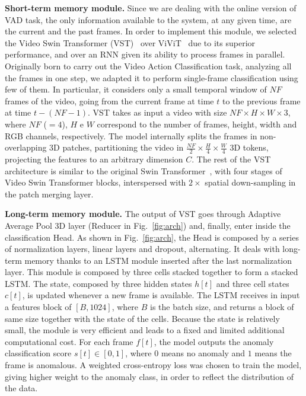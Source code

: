 \noindent\textbf{Short-term memory module.}
Since we are dealing with the online version of VAD task, the only information available to the system, at any given time, are the current and the past frames.
In order to implement this module, we selected the Video Swin Transformer (VST)~\cite{liu_video_2022} over ViViT~\cite{Arnab_2021_ICCV} due to its superior performance, and over an RNN given its ability to process frames in parallel.
Originally born to carry out the Video Action Classification task, analyzing all the frames in one step, we adapted it to perform single-frame classification using few of them.
In particular, it considers only a small temporal window of $\mathit{NF}$ frames of the video, going from the current frame at time $t$ to the previous frame at time $t-\left(\mathit{NF}-1\right)$.
VST takes as input a video with size $\mathit{NF} \times H \times W \times 3$, where $\mathit{NF}$ ($=4$), $H$ e $W$ correspond to the number of frames, height, width and RGB channels, respectively.
The model internally splits the frames in non-overlapping 3D patches, partitioning the video in $\frac{\mathit{NF}}{2} \times \frac{H}{4} \times \frac{W}{4}$ 3D tokens, projecting the features to an arbitrary dimension $C$.
The rest of the VST architecture is similar to the original Swin Transformer~\cite{liu2021Swin}, with four stages of Video Swin Transformer blocks, interspersed with $2\times$ spatial down-sampling in the patch merging layer.

\noindent\textbf{Long-term memory module.}
The output of VST goes through Adaptive Average Pool 3D layer (Reducer in Fig.~\ref{fig:arch}) and, finally, enter inside the classification Head.
As shown in Fig.~\ref{fig:arch}, the Head is composed by a series of normalization layers, linear layers and dropout, alternating. 
It deals with long-term memory thanks to an LSTM module inserted after the last normalization layer.
This module is composed by three cells stacked together to form a stacked LSTM.
The state, composed by three hidden states $h[t]$ and three cell states $c[t]$, is updated whenever a new frame is available.
The LSTM receives in input a features block of $[B, 1024]$, where $B$ is the batch size, and returns a block of same size together with the state of the cells.
Because the state is relatively small, the module is very efficient and leads to a fixed and limited additional computational cost.
For each frame $f[t]$, the model outputs the anomaly classification score $s[t] \in [0,1]$, where $0$ means no anomaly and $1$ means the frame is anomalous.
A weighted cross-entropy loss was chosen to train the model, giving higher weight to the anomaly class, in order to reflect the distribution of the data.

